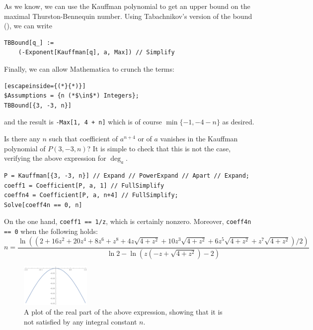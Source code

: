 As we know, we can use the Kauffman polynomial to get an upper bound on the maximal Thurston-Bennequin number. Using Tabachnikov's version of the bound (\cite{tabachnikov}), we can write

\begin{lstlisting}
TBBound[q_] :=
    (-Exponent[Kauffman[q], a, Max]) // Simplify
\end{lstlisting}

Finally, we can allow Mathematica to crunch the terms:

\begin{lstlisting}[escapeinside={(*}{*)}]
$Assumptions = {n (*$\in$*) Integers};
TBBound[{3, -3, n}]
\end{lstlisting}

and the result is \lstinline|-Max[1, 4 + n]| which is of course $\min\{-1, -4-n\}$ as desired.

Is there any $n$ such that coefficient of $a^{n+4}$ or of $a$ vanishes in the Kauffman polynomial of $P(3, -3, n)$?
It is simple to check that this is not the case, verifying the above expression for $\deg_a$.

\begin{lstlisting}
P = Kauffman[{3, -3, n}] // Expand // PowerExpand // Apart // Expand;
coeff1 = Coefficient[P, a, 1] // FullSimplify
coeffn4 = Coefficient[P, a, n+4] // FullSimplify;
Solve[coeff4n == 0, n]
\end{lstlisting}

On the one hand, \lstinline|coeff1 == 1/z|, which is certainly nonzero. Moreover, \lstinline|coeff4n == 0| when the following holds:
\[
    n = \frac{ \ln\left((2 + 16 z^2 + 20 z^4 + 8 z^6 + z^8 + 4 z \sqrt{4 + z^2} + 10 z^3 \sqrt{4 + z^2} + 6 z^5 \sqrt{4 + z^2} + z^7 \sqrt{4 + z^2})/2\right)}{\ln 2 - \ln \left(z (-z + \sqrt{4 + z^2}) - 2\right)}
\]
\begin{figure}[h]
    \centering
    \includegraphics[width=0.3\textwidth]{images/mathematica-n.pdf}
    \caption{A plot of the real part of the above expression, showing that it is not satisfied by any integral constant $n$.}
\end{figure}


